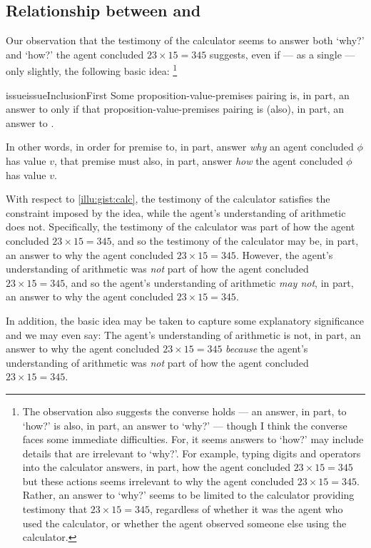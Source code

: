 \subsection{Relationship between \qWhy{} and \qHow{}}

\begin{note}
  Our observation that the testimony of the calculator seems to answer both `why?' and `how?' the agent concluded \(23 \times 15 = 345\) suggests, even if --- as a single  --- only slightly, the following basic idea:%
  \footnote{
    The observation also suggests the converse holds --- an answer, in part, to `how?' is also, in part, an answer to `why?' --- though I think the converse faces some immediate difficulties.
    For, it seems answers to `how?' may include details that are irrelevant to `why?'.
    For example, typing digits and operators into the calculator answers, in part, how the agent concluded \(23 \times 15 = 345\) but these actions seems irrelevant to why the agent concluded \(23 \times 15 = 345\).
    Rather, an answer to `why?' seems to be limited to the calculator providing testimony that \(23 \times 15 = 345\), regardless of whether it was the agent who used the calculator, or whether the agent observed someone else using the calculator.
  }

  \begin{restatable}[\issueInclusion{}]{issue}{issueInclusionFirst}
    \label{issue:why-inc-in-how}
    Some proposition-value-premises pairing is, in part, an answer to \qWhy{} only if that proposition-value-premises pairing is (also), in part, an answer to \qHow{}.
  \end{restatable}

  In other words, in order for premise to, in part, answer \emph{why} an agent concluded \(\phi\) has value \(v\), that premise must also, in part, answer \emph{how} the agent concluded \(\phi\) has value \(v\).

  With respect to \autoref{illu:gist:calc}, the testimony of the calculator satisfies the constraint imposed by the idea, while the agent's understanding of arithmetic does not.
  Specifically, the testimony of the calculator was part of how the agent concluded \(23 \times 15 = 345\), and so the testimony of the calculator may be, in part, an answer to why the agent concluded \(23 \times 15 = 345\).
  However, the agent's understanding of arithmetic was \emph{not} part of how the agent concluded \(23 \times 15 = 345\), and so the agent's understanding of arithmetic \emph{may not}, in part, an answer to why the agent concluded \(23 \times 15 = 345\).

  In addition, the basic idea may be taken to capture some explanatory significance and we may even say:
  The agent's understanding of arithmetic is not, in part, an answer to why the agent concluded \(23 \times 15 = 345\) \emph{because} the agent's understanding of arithmetic was \emph{not} part of how the agent concluded \(23 \times 15 = 345\).
\end{note}

